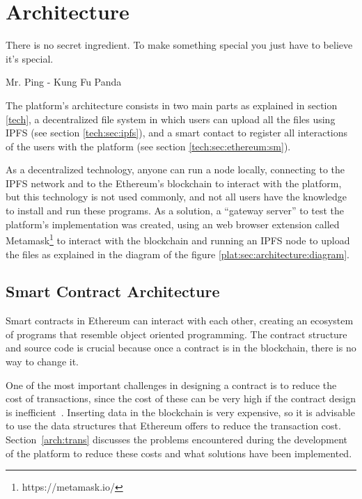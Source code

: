 

\chapter{Architecture}

\begin{FraseCelebre}
  \begin{Frase}
    There is no secret ingredient. To make something special you just have to
    believe it's special.
  \end{Frase}
  \begin{Fuente}
    Mr. Ping - Kung Fu Panda
  \end{Fuente}
\end{FraseCelebre}

The platform's architecture consists in two main parts as explained in section
\ref{tech}, a decentralized file system in which users can upload all the files
using IPFS (see section \ref{tech:sec:ipfs}), and a smart contact to register
all interactions of the users with the platform (see section
\ref{tech:sec:ethereum:sm}).

As a decentralized technology, anyone can run a node locally, connecting to the
IPFS network and to the Ethereum's blockchain to interact with the platform, but
this technology is not used commonly, and not all users have the knowledge to
install and run these programs. As a solution, a ``gateway server'' to test the
platform's implementation was created, using an web browser extension called
Metamask\footnote[1]{https://metamask.io/} to interact with the blockchain and
running an IPFS node to upload the files as explained in the diagram of the
figure \ref{plat:sec:architecture:diagram}.


\section{Smart Contract Architecture}
\label{arch:sca}
Smart contracts in Ethereum can interact with each other, creating an ecosystem
of programs that resemble object oriented programming. The contract structure
and source code is crucial because once a contract is in the blockchain, there
is no way to change it.

One of the most important challenges in designing a contract is to reduce the
cost of transactions, since the cost of these can be very high if the contract
design is inefficient~\cite{croman2016scaling}. Inserting data in the blockchain
is very expensive, so it is advisable to use the data structures that Ethereum
offers to reduce the transaction cost. Section~\ref{arch:trans} discusses the
problems encountered during the development of the platform to reduce these
costs and what solutions have been implemented.

